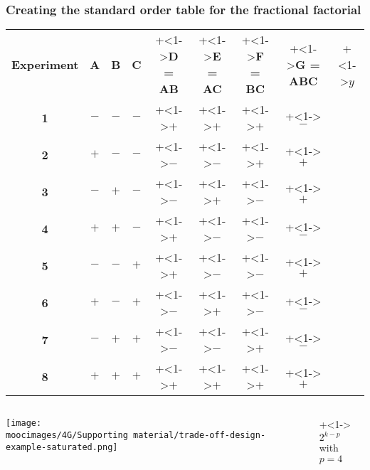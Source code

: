 \documentclass[handout,11pt,aspectratio=169,mathserif]{beamer}
\begin{document}
\begin{frame}\frametitle{Creating the standard order table for the fractional factorial}
	\vspace{0.4cm}
	\begin{tabulary}{\linewidth}{c|ccccccc|c}
		\textbf{\relax Experiment} & \textbf{\relax A } & \textbf{\relax B} & \textbf{\relax C } & \onslide+<1->{\textbf{\relax D = AB}} & \onslide+<1->{\textbf{\relax E = AC}} & \onslide+<1->{\textbf{\relax F = BC}} & \onslide+<1->{\textbf{\relax G = ABC}} & \onslide+<1->{$y$}\\ 
		\textbf{1} & \(-\) & \(-\) & \(-\) & \onslide+<1->{\(+\)} & \onslide+<1->{\(+\)} & \onslide+<1->{\(+\)} & \onslide+<1->{\(-\)} \\
		\textbf{2} & \(+\) & \(-\) & \(-\) & \onslide+<1->{\(-\)} & \onslide+<1->{\(-\)} & \onslide+<1->{\(+\)} & \onslide+<1->{\(+\)} \\
		\textbf{3} & \(-\) & \(+\) & \(-\) & \onslide+<1->{\(-\)} & \onslide+<1->{\(+\)} & \onslide+<1->{\(-\)} & \onslide+<1->{\(+\)} \\
		\textbf{4} & \(+\) & \(+\) & \(-\) & \onslide+<1->{\(+\)} & \onslide+<1->{\(-\)} & \onslide+<1->{\(-\)} & \onslide+<1->{\(-\)} \\
		\textbf{5} & \(-\) & \(-\) & \(+\) & \onslide+<1->{\(+\)} & \onslide+<1->{\(-\)} & \onslide+<1->{\(-\)} & \onslide+<1->{\(+\)} \\
		\textbf{6} & \(+\) & \(-\) & \(+\) & \onslide+<1->{\(-\)} & \onslide+<1->{\(+\)} & \onslide+<1->{\(-\)} & \onslide+<1->{\(-\)} \\
		\textbf{7} & \(-\) & \(+\) & \(+\) & \onslide+<1->{\(-\)} & \onslide+<1->{\(-\)} & \onslide+<1->{\(+\)} & \onslide+<1->{\(-\)} \\
		\textbf{8} & \(+\) & \(+\) & \(+\) & \onslide+<1->{\(+\)} & \onslide+<1->{\(+\)} & \onslide+<1->{\(+\)} & \onslide+<1->{\(+\)} \\ 
	\end{tabulary}
	
	\vspace{0.4cm}
	
	
	\begin{columns}[T]
		
			\centerline{\texttt{[image: \\moocimages/4G/Supporting material/trade-off-design-example-saturated.png]}}
		
			\onslide+<1->{
				{\huge $2^{k-p}$\\
				{\normalsize with} $p=4$}
			}
	\end{columns}
\end{frame}
\end{document}
